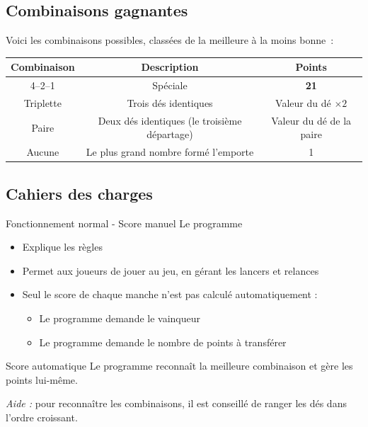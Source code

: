 \subsection*{Combinaisons gagnantes}
Voici les combinaisons possibles, classées de la meilleure à la moins bonne :
\begin{center}
\begin{tabular}{|c|c|c|}
\hline
\textbf{Combinaison} & \textbf{Description} & \textbf{Points} \\ \hline
4--2--1 & Spéciale & \textbf{21} \\ \hline
Triplette & Trois dés identiques & Valeur du dé $\times 2$ \\ \hline
Paire & Deux dés identiques (le troisième départage) & Valeur du dé de la paire \\ \hline
Aucune & Le plus grand nombre formé l’emporte & 1 \\ \hline
\end{tabular}
\end{center}

\subsection*{Cahiers des charges}
\begin{UPSTICahierDesCharges}{Fonctionnement normal - Score manuel}
  Le programme
  \begin{itemize}
    \item Explique les règles
    \item Permet aux joueurs de jouer au jeu, en gérant les lancers et relances
    \item Seul le score de chaque manche n'est pas calculé automatiquement : 
    \begin{itemize}
      \item Le programme demande le vainqueur
      \item Le programme demande le nombre de points à transférer
    \end{itemize}
  \end{itemize}
\end{UPSTICahierDesCharges}

\begin{UPSTICahierDesCharges}{Score automatique}
  Le programme reconnaît la meilleure combinaison et gère les points lui-même.

  \textit{Aide :} pour reconnaître les combinaisons, il est conseillé de ranger les dés dans l'ordre croissant.
\end{UPSTICahierDesCharges}

